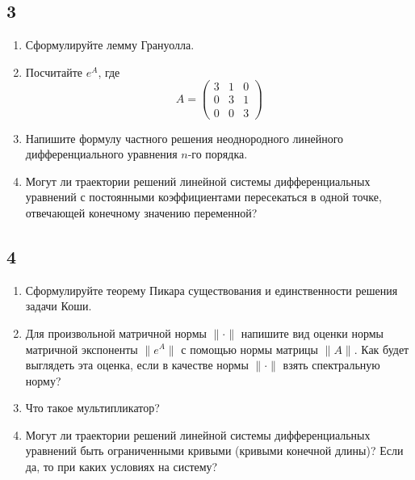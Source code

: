 \documentclass[10pt, a4paper]{article}
\begin{document}
    \subsection*{3}
    \begin{enumerate}
        \item Сформулируйте лемму Грануолла.
        \item Посчитайте $e^A$, где $$A = \begin{pmatrix}
            3 & 1 & 0 \\ 0 & 3 & 1 \\ 0 & 0 & 3
        \end{pmatrix}$$
        \item Напишите формулу частного решения неоднородного линейного 
            дифференциального уравнения $n$-го порядка.
        \item Могут ли траектории решений линейной системы дифференциальных уравнений
            с постоянными коэффициентами пересекаться в одной точке, 
            отвечающей конечному значению переменной?
    \end{enumerate}

    \subsection*{4}
    \begin{enumerate}
        \item Сформулируйте теорему Пикара существования и единственности 
            решения задачи Коши.
        \item Для произвольной матричной нормы $\|\cdot\|$ напишите вид оценки
            нормы матричной экспоненты $\|e^A\|$ с помощью нормы матрицы $\|A\|$.
            Как будет выглядеть эта оценка, если в качестве нормы $\|\cdot\|$ взять
            спектральную норму?
        \item Что такое мультипликатор?
        \item Могут ли траектории решений линейной системы дифференциальных уравнений
            быть ограниченными кривыми (кривыми конечной длины)? 
            Если да, то при каких условиях на систему?
    \end{enumerate}
\end{document}
